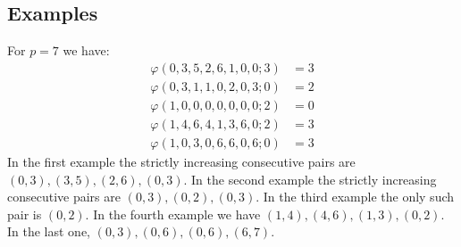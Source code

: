 \subsection*{Examples} For $p=7$ we have:
\begin{align*}
	\varphi(0,3,5,2,6,1,0,0;3) &= 3 \\
	\varphi(0,3,1,1,0,2,0,3;0) &= 2 \\
	\varphi(1,0,0,0,0,0,0,0;2) &= 0 \\
	\varphi(1,4,6,4,1,3,6,0;2) &= 3 \\
	\varphi(1,0,3,0,6,6,0,6;0) &= 3
\end{align*}
In the first example the strictly increasing consecutive pairs are $(0,3),(3,5),(2,6),(0,3)$. In the second example the strictly increasing consecutive pairs are $(0,3),(0,2),(0,3)$. In the third example the only such pair is $(0,2)$. In the fourth example we have $(1,4),(4,6),(1,3),(0,2)$. In the last one, $(0,3),(0,6),(0,6),(6,7)$.
